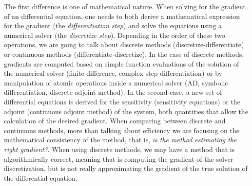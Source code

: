 The first difference is one of mathematical nature. 
When solving for the gradient of an differential equation, one needs to both derive a mathematical expression for the gradient (the \textit{differentiation step}) and solve the equations using a numerical solver (the \textit{discretize step})\cite{bradley2013pde, Onken_Ruthotto_2020, FATODE2014, Sirkes_Tziperman_1997}. 
Depending in the order of these two operations, we are going to talk about discrete methods (discretize-differentiate) or continuous methods (differentiate-discretize). 
In the case of discrete methods, gradients are computed based on simple function evaluations of the solution of the numerical solver (finite difference, complex step differentiation) or by manipulation of atomic operations inside a numerical solver (AD, symbolic differentiation, discrete adjoint method). 
In the second case, a new set of differential equations is derived for the sensitivity (sensitivity equations) or the adjoint (continuous adjoint method) of the system, both quantities that allow the calculation of the desired gradient.   
When comparing between discrete and continuous methods, more than talking about efficiency we are focusing on the mathematical consistency of the method, that is, \textit{is the method estimating the right gradient?}. 
When using discrete methods, we may have a method that is algorithmically correct, meaning that is computing the gradient of the solver discretization, but is not really approximating the gradient of the true solution of the differential equation. 

